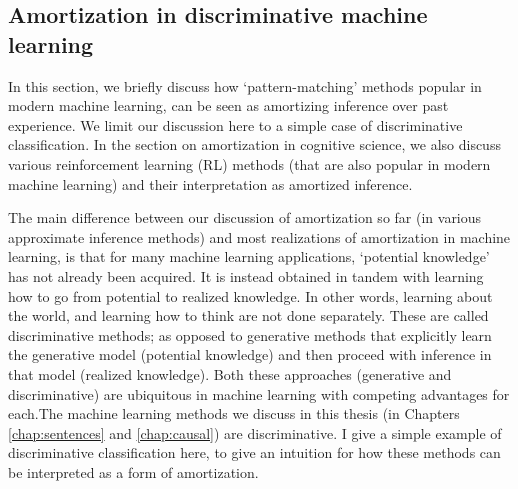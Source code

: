 \subsection{Amortization in discriminative machine learning}

In this section, we briefly discuss how `pattern-matching' methods popular in modern machine learning, can be seen as amortizing inference over past experience. We limit our discussion here to a simple case of discriminative classification. In the section on amortization in cognitive science, we also discuss various reinforcement learning (RL) methods (that are also popular in modern machine learning) and their interpretation as amortized inference.

The main difference between our discussion of amortization so far (in various approximate inference methods) and most realizations of amortization in machine learning, is that for many machine learning applications, `potential knowledge' has not already been acquired. It is instead obtained in tandem with learning how to go from potential to realized knowledge. In other words, learning about the world, and learning how to think are not done separately. These are called discriminative methods; as opposed to generative methods that explicitly learn the generative model (potential knowledge) and then proceed with inference in that model (realized knowledge). Both these approaches (generative and discriminative) are ubiquitous in machine learning with competing advantages for each\citep{ng2002discriminative, lasserre2006principled}.The machine learning methods we discuss in this thesis (in Chapters \ref{chap:sentences} and \ref{chap:causal}) are discriminative. I give a simple example of discriminative classification here, to give an intuition for how these methods can be interpreted as a form of amortization.

